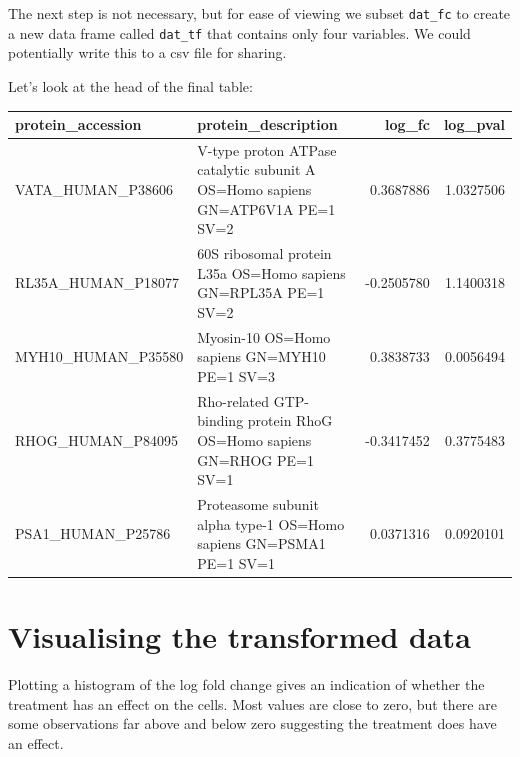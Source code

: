 \documentclass[12pt,]{book}
\newenvironment{Shaded}{\begin{snugshade}}{\end{snugshade}}
\newcommand{\KeywordTok}[1]{\textcolor[rgb]{0.13,0.29,0.53}{\textbf{#1}}}
\newcommand{\StringTok}[1]{\textcolor[rgb]{0.31,0.60,0.02}{#1}}
\newcommand{\CommentTok}[1]{\textcolor[rgb]{0.56,0.35,0.01}{\textit{#1}}}
\newcommand{\OperatorTok}[1]{\textcolor[rgb]{0.81,0.36,0.00}{\textbf{#1}}}
\newcommand{\NormalTok}[1]{#1}
\theoremstyle{definition}
\theoremstyle{definition}
\theoremstyle{definition}
\theoremstyle{remark}
\begin{document}
The next step is not necessary, but for ease of viewing we subset
\texttt{dat\_fc} to create a new data frame called \texttt{dat\_tf} that
contains only four variables. We could potentially write this to a csv
file for sharing.

\begin{Shaded}
\end{Shaded}

Let's look at the head of the final table:

\begin{tabular}{llrr}
\toprule
protein\_accession & protein\_description & log\_fc & log\_pval\\
\midrule
VATA\_HUMAN\_P38606 & V-type proton ATPase catalytic subunit A OS=Homo sapiens GN=ATP6V1A PE=1 SV=2 & 0.3687886 & 1.0327506\\
RL35A\_HUMAN\_P18077 & 60S ribosomal protein L35a OS=Homo sapiens GN=RPL35A PE=1 SV=2 & -0.2505780 & 1.1400318\\
MYH10\_HUMAN\_P35580 & Myosin-10 OS=Homo sapiens GN=MYH10 PE=1 SV=3 & 0.3838733 & 0.0056494\\
RHOG\_HUMAN\_P84095 & Rho-related GTP-binding protein RhoG OS=Homo sapiens GN=RHOG PE=1 SV=1 & -0.3417452 & 0.3775483\\
PSA1\_HUMAN\_P25786 & Proteasome subunit alpha type-1 OS=Homo sapiens GN=PSMA1 PE=1 SV=1 & 0.0371316 & 0.0920101\\
\bottomrule
\end{tabular}

\section{Visualising the transformed
data}\label{visualising-the-transformed-data}

Plotting a histogram of the log fold change gives an indication of
whether the treatment has an effect on the cells. Most values are close
to zero, but there are some observations far above and below zero
suggesting the treatment does have an effect.
\end{document}
